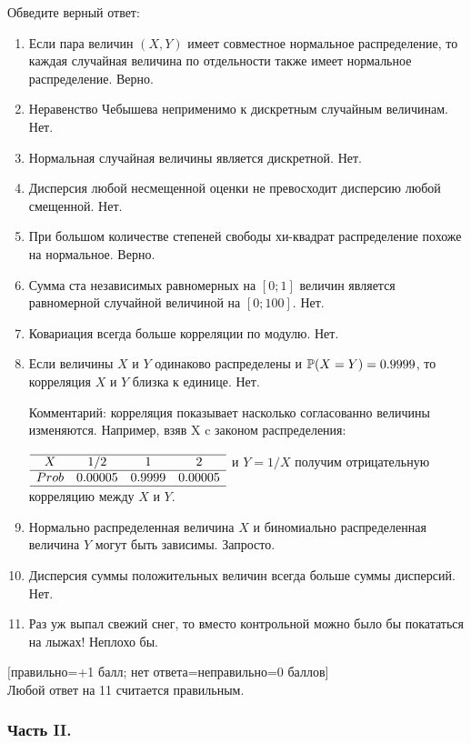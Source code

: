 \documentclass[12pt, a4paper]{article}\usepackage[]{graphicx}\usepackage[]{color}
\begin{document}
Обведите верный ответ:
\begin{enumerate}
\item Если пара величин $(X,Y)$ имеет совместное нормальное распределение, то каждая случайная величина по отдельности также имеет нормальное распределение. Верно.
\item Неравенство Чебышева неприменимо к дискретным случайным величинам. Нет.
\item Нормальная случайная величины является дискретной. Нет.
\item Дисперсия любой несмещенной оценки не превосходит дисперсию любой смещенной. Нет.
\item При большом количестве степеней свободы хи-квадрат распределение похоже на нормальное. Верно.
\item Сумма ста независимых равномерных на $[0;1]$ величин является равномерной случайной величиной на $[0;100]$. Нет.
\item Ковариация всегда больше корреляции по модулю.  Нет.
\item Если величины $X$ и $Y$ одинаково распределены и $\P(X=Y)=0.9999$, то корреляция $X$ и $Y$ близка к единице. Нет.

Комментарий: корреляция показывает насколько согласованно величины изменяются. Например, взяв X c законом распределения:
$\begin{array}{cccc} \\
\hline
X & 1/2 & 1 & 2 \\
\hline
Prob & 0.00005 & 0.9999 & 0.00005 \\
\hline
\end{array}$
и $Y=1/X$ получим отрицательную корреляцию между $X$ и $Y$.
\item Нормально распределенная величина $X$ и биномиально распределенная величина $Y$ могут быть зависимы. Запросто.
\item Дисперсия суммы положительных величин всегда больше суммы дисперсий. Нет.
\item Раз уж выпал свежий снег, то вместо контрольной можно
было бы покататься на лыжах! Неплохо бы.
\end{enumerate}

$[$правильно=+1 балл; нет ответа=неправильно=0 баллов$]$ \\
Любой ответ на 11 считается правильным. \\


\subsubsection*{Часть II.}
\end{document}
